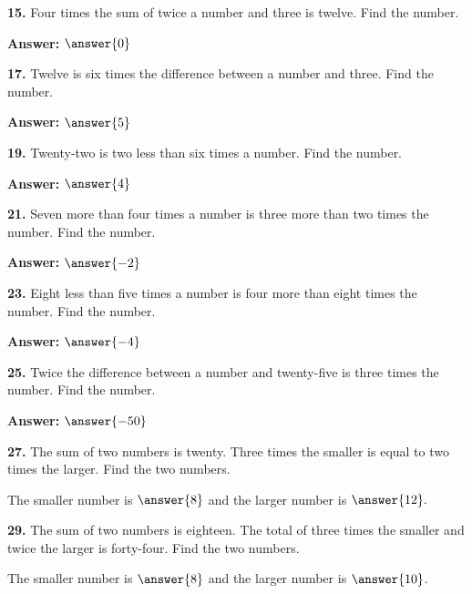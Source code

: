\documentclass{ximera}
\begin{document}
\begin{problem}
\textbf{15.} Four times the sum of twice a number and three is twelve. Find the number.

\textbf{Answer:} $\answer{0}$
\end{problem}

\begin{problem}
\textbf{17.} Twelve is six times the difference between a number and three. Find the number.

\textbf{Answer:} $\answer{5}$
\end{problem}

\begin{problem}
\textbf{19.} Twenty-two is two less than six times a number. Find the number.

\textbf{Answer:} $\answer{4}$
\end{problem}

\begin{problem}
\textbf{21.} Seven more than four times a number is three more than two times the number.
  Find the number.

\textbf{Answer:} $\answer{-2}$
\end{problem}

\begin{problem}
\textbf{23.} Eight less than five times a number is four more than eight times the number.
  Find the number.

\textbf{Answer:} $\answer{-4}$
\end{problem}

\begin{problem}
\textbf{25.} Twice the difference between a number and twenty-five is three times the number.
  Find the number.

\textbf{Answer:} $\answer{-50}$
\end{problem}

\begin{problem}
\textbf{27.} The sum of two numbers is twenty. Three times the smaller is equal to two times
  the larger. Find the two numbers.

The smaller number is $\answer{8}$ and the larger number is $\answer{12}.$
\end{problem}

\begin{problem}
\textbf{29.} The sum of two numbers is eighteen. The total of three times the smaller and
  twice the larger is forty-four. Find the two numbers.

The smaller number is $\answer{8}$ and the larger number is $\answer{10}$. \end{problem}
\end{document}
